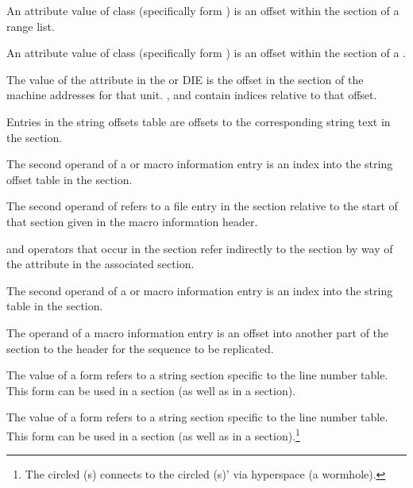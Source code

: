 \begin{description}
An attribute value of class  
(specifically form
\DWFORMsecoffset) 
is an offset within the \dotdebugranges{} section of
a range list.

An attribute value of class  
(specifically form
\DWFORMsecoffset) 
is an offset within the \dotdebugloc{} 
section of a
.

The value of the \DWATaddrbase{} attribute in the
\DWTAGcompileunit{} or \DWTAGpartialunit{} DIE is the
offset in the \dotdebugaddr{} section of the machine
addresses for that unit.
\DWFORMaddrx, \DWOPaddrx{} and \DWOPconstx{} contain
indices relative to that offset.

Entries in the string offsets table
are offsets to the corresponding string text in the 
\dotdebugstr{} section.

The second operand of a 
\DWMACROdefinestrx{} or \DWMACROundefstrx{} 
macro information entry is an index
into the string offset table in the 
\dotdebugstroffsets{} section.

The second operand of 
\DWMACROstartfile{} refers to a file entry in the 
\dotdebugline{} section relative to the start 
of that section given in the macro information header.

\DWOPaddrx{} and \DWOPconstx{} operators that occur in the 
\dotdebugloc{} section refer indirectly to the 
\dotdebugaddr{} section by way of the 
\DWATaddrbase{} attribute in the associated \dotdebuginfo{} 
section.

The second operand of a 
\DWMACROdefinestrp{} or \DWMACROundefstrp{} macro information
entry is an index into the string table in the 
\dotdebugstr{} section.

The operand of a 
\DWMACROimport{} macro information
entry is an offset into another part of the 
\dotdebugmacro{} section to the header for the 
sequence to be replicated.

The value of a \DWFORMlinestrp{} form refers to a
string section specific to the line number table.
This form can be used in a \dotdebugline{} section
(as well as in a \dotdebuginfo{} section).

The value of a \DWFORMlinestrp{} form refers to a
string section specific to the line number table.
This form can be used in a \dotdebuginfo{} section
(as well as in a \dotdebugline{} section).\footnote{ 
The circled (s) connects to the circled
(s)' via hyperspace (a wormhole).}
 
\end{description}




